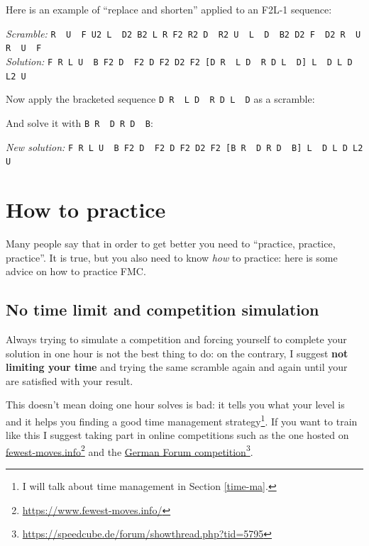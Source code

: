 \documentclass[11pt,a4paper]{book}
\newcommand{\p}{\textquotesingle}
\newcommand{\m}{\texttt}
\newcommand{\ps}{\p\,\,}
\begin{document}
Here is an example of ``replace and shorten'' applied to an F2L-1 sequence:
\begin{center}
\emph{Scramble:} \m{R\ps U\ps F U2 L\ps D2 B2 L R F2 R2 D\ps R2 U\ps L\ps D\ps B2 D2 F\ps D2 R\ps U R\ps U\ps F}\\
\emph{Solution:} \m{F R L U\ps B F2 D\ps F2 D F2 D2 F2 [D R\ps L D\ps R D L\ps D\p] L\ps D L D L2 U}
\end{center}
Now apply the bracketed sequence \m{D R\ps L D\ps R D L\ps D\p} as a scramble:
\begin{center}

\end{center}
And solve it with \m{B R\ps D R D\ps B\p}:
\begin{center}
\emph{New solution:} \m{F R L U\ps B F2 D\ps F2 D F2 D2 F2 [B R\ps D R D\ps B\p] L\ps D L D L2 U}
\end{center}


%
%
%
%
%



\chapter{How to practice}

Many people say that in order to get better you need to ``practice, practice, practice''. It is true, but you also need to know \emph{how} to practice: here is some advice on how to practice FMC.

\section{No time limit and competition simulation}

Always trying to simulate a competition and forcing yourself to complete your solution in one hour is not the best thing to do: on the contrary, I suggest \textbf{not limiting your time} and trying the same scramble again and again until your are satisfied with your result.

This doesn't mean doing one hour solves is bad: it tells you what your level is and it helps you finding a good time management strategy\footnote{I will talk about time management in Section \ref{time-ma}.}. If you want to train like this I suggest taking part in online competitions such as the one hosted on \href{https://www.fewest-moves.info/}{fewest-moves.info}\footnote{\url{https://www.fewest-moves.info/}} and the \href{https://speedcube.de/forum/showthread.php?tid=5795}{German Forum competition}\footnote{\url{https://speedcube.de/forum/showthread.php?tid=5795}}.
\end{document}
